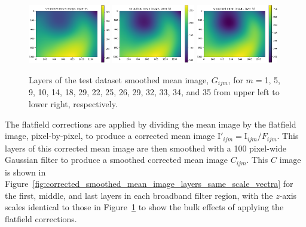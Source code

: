 \documentclass[letterpaper,11pt]{article}
\newcommand{\reffig}[1]{Figure~\ref{#1}}
\newcommand{\Iota}{\mathrm{I}}
\begin{document}
\begin{figure}[!ht]
\includegraphics[width=0.32\textwidth]{images/results/smoothed_mean_image_layers/smoothed_mean_image_layer_33}
\includegraphics[width=0.32\textwidth]{images/results/smoothed_mean_image_layers/smoothed_mean_image_layer_34}
\includegraphics[width=0.32\textwidth]{images/results/smoothed_mean_image_layers/smoothed_mean_image_layer_35}
\caption{\footnotesize Layers of the test dataset smoothed mean image, $G_{ijm}$, for $m=$1, 5, 9, 10, 14, 18, 29, 22, 25, 26, 29, 32, 33, 34, and 35 from upper left to lower right, respectively.}
\label{fig:uncorrected_mean_image_layers_vectra}
\end{figure}

The flatfield corrections are applied by dividing the mean image by the flatfield image, pixel-by-pixel, to produce a corrected mean image $\Iota'_{ijm}=\Iota_{ijm}/F_{ijm}$. This layers of this corrected mean image are then smoothed with a 100 pixel-wide Gaussian filter to produce a smoothed corrected mean image $C_{ijm}$. This $C$ image is shown in \reffig{fig:corrected_smoothed_mean_image_layers_same_scale_vectra} for the first, middle, and last layers in each broadband filter region, with the $z$-axis scales identical to those in \reffig{fig:uncorrected_mean_image_layers_vectra} to show the bulk effects of applying the flatfield corrections.
\end{document}
